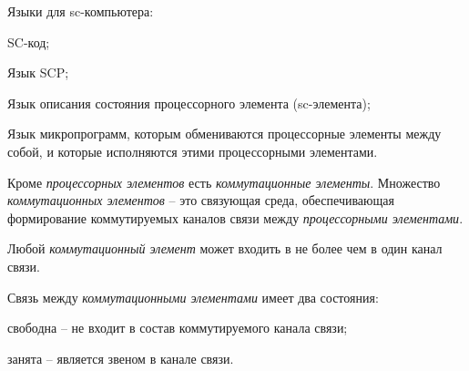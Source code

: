 Языки для sc-компьютера:
\begin{textitemize}
	\item SC-код;
	\item Язык SCP;
	\item Язык описания состояния процессорного элемента (sc-элемента);
	\item Язык микропрограмм, которым обмениваются процессорные элементы между собой, и которые исполняются этими процессорными элементами.
\end{textitemize}

Кроме \textit{процессорных элементов} есть \textit{коммутационные элементы}. Множество \textit{коммутационных элементов} -- это связующая среда, обеспечивающая формирование коммутируемых каналов связи между \textit{процессорными элементами}. 

Любой \textit{коммутационный элемент} может входить в не более чем в один канал связи. %

Связь между \textit{коммутационными элементами} имеет два состояния:
\begin{textitemize}
	\item свободна -- не входит в состав коммутируемого канала связи;
	\item занята -- является звеном в канале связи.
\end{textitemize}